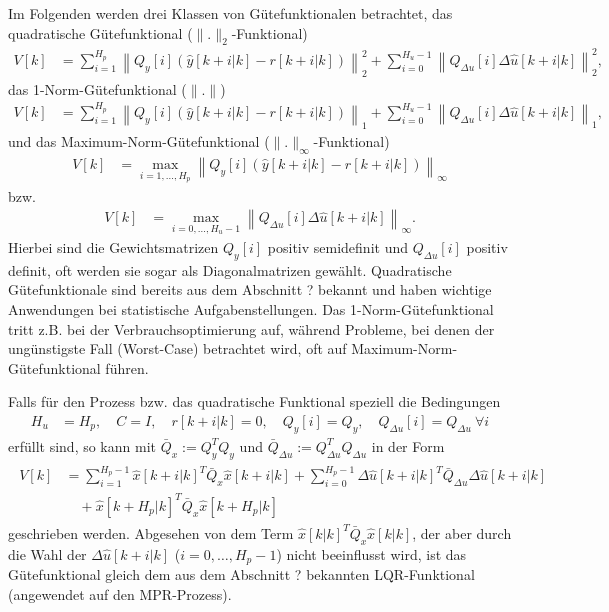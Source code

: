 Im Folgenden werden drei Klassen von Gütefunktionalen betrachtet, das quadratische Gütefunktional ($\|.\|_2$-Funktional)
\begin{align}
V[k] & = \sum\limits_{i=1}^{H_p}\left\|Q_y[i]\left(\hat{y}[k+i|k]-r[k+i|k]\right)\right\|_2^2+\sum\limits_{i=0}^{H_u-1}\left\|Q_{\Delta u}[i]\Delta\hat{u}[k+i|k]\right\|_2^2
\label{eqn:kap_4_quad_guetefunktional},
\end{align}
das 1-Norm-Gütefunktional ($\|.\|$)
\begin{align}
V[k] & = \sum\limits_{i=1}^{H_p}\left\|Q_y[i]\left(\hat{y}[k+i|k]-r[k+i|k]\right)\right\|_1+\sum\limits_{i=0}^{H_u-1}\left\|Q_{\Delta
u}[i]\Delta\hat{u}[k+i|k]\right\|_1,\label{eqn:kap_4_eins_norm_guetefunktional}
\end{align}
und das Maximum-Norm-Gütefunktional ($\|.\|_{\infty}$-Funktional)
\begin{align}
	V[k] & = \max\limits_{i=1,\ldots,H_p}\left\|Q_{y}[i]\left(\hat{y}[k+i|k]-r[k+i|k] \right)\right\|_{\infty}\label{eqn:kap_4_max_norm_guetefunktional_1}
\end{align}
bzw.
\begin{align}
	V[k] & = \max\limits_{i=0,\ldots,H_u-1}\left\|Q_{\Delta u}[i]\Delta\hat{u}[k+i|k] \right\|_{\infty}.\label{eqn:kap_4_max_norm_guetefunktional_2}
\end{align}
Hierbei sind die Gewichtsmatrizen $Q_{y}[i]$ positiv semidefinit und $Q_{\Delta u}[i]$ positiv definit, oft werden sie sogar als Diagonalmatrizen gewählt. Quadratische Gütefunktionale
sind bereits aus dem Abschnitt ? bekannt und haben wichtige Anwendungen bei statistische Aufgabenstellungen. Das 1-Norm-Gütefunktional tritt z.B. bei der Verbrauchsoptimierung auf,
während Probleme, bei denen der ungünstigste Fall (Worst-Case) betrachtet wird, oft auf Maximum-Norm-Gütefunktional führen.
\begin{exmp}\label{exmp:kap_4_bsp_siso_nb}
Falls für den Prozess  bzw. das quadratische Funktional  speziell die Bedingungen 
\begin{align*}
H_u & = H_p,\quad C=I,\quad r[k+i|k]=0,\quad Q_y[i]=Q_y,\quad Q_{\Delta u}[i]=Q_{\Delta u}\ \forall i
\end{align*}
erfüllt sind, so kann  mit $\bar{Q}_x:=Q_y^TQ_y$ und $\bar{Q}_{\Delta u}:=Q^T_{\Delta u}Q_{\Delta u}$ in der Form
\begin{align}
\begin{split}\label{eqn:kap_4_bsp_1_kostenfunktionial}
V[k] & = \sum\limits_{i=1}^{H_p-1}\hat{x}[k+i|k]^T\bar{Q}_{x}\hat{x}[k+i|k]+\sum\limits_{i=0}^{H_p-1}\Delta\hat{u}[k+i|k]^T\bar{Q}_{\Delta u}\Delta\hat{u}[k+i|k]\\
& \quad +\hat{x}[k+H_p|k]^T\bar{Q}_{x}\hat{x}[k+H_p|k]
\end{split}
\end{align}
geschrieben werden. Abgesehen von dem Term $\hat{x}[k|k]^T\bar{Q}_{x}\hat{x}[k|k]$, der aber durch die Wahl der $\Delta\hat{u}[k+i|k]$ ($i=0,\ldots,H_p-1$) nicht beeinflusst wird, ist
das Gütefunktional  gleich dem aus dem Abschnitt ? bekannten \ac{LQR}-Funktional (angewendet auf den \ac{MPR}-Prozess).
\end{exmp}
